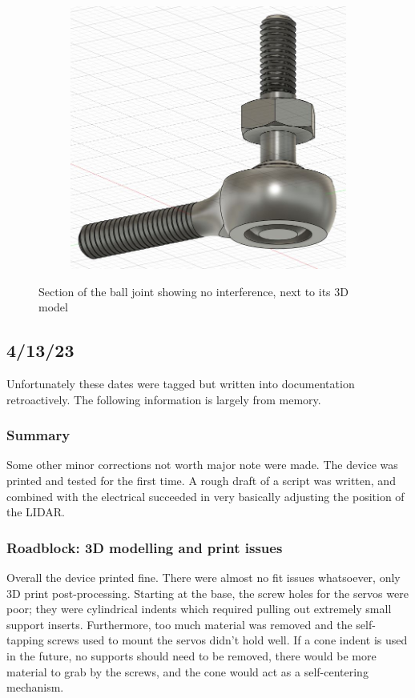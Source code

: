 \documentclass[a4paper, 10pt]{article}
\begin{document}
\begin{figure}[h]
\begin{subfigure}[h]{0.34\textwidth}
			\end{subfigure}
			\hfill
			\begin{subfigure}[h]{0.65\textwidth}
				\centering
				\includegraphics[width=\textwidth]{ball_joint}
			\end{subfigure}
			\centering
			\caption{Section of the ball joint showing no interference, next to its 3D model}
			\label{ball_joint}
		\end{figure}
		
	\subsection{4/13/23}
	Unfortunately these dates were tagged but written into documentation retroactively. The following information is largely from memory.
		\subsubsection{Summary}
		Some other minor corrections not worth major note were made. The device was printed and tested for the first time. A rough draft of a script was written, and combined with the electrical succeeded in very basically adjusting the position of the LIDAR. 
		
		\subsubsection{Roadblock: 3D modelling and print issues}
		Overall the device printed fine. There were almost no fit issues whatsoever, only 3D print post-processing. Starting at the base, the screw holes for the servos were poor; they were cylindrical indents which required pulling out extremely small support inserts. Furthermore, too much material was removed and the self-tapping screws used to mount the servos didn't hold well. If a cone indent is used in the future, no supports should need to be removed, there would be more material to grab by the screws, and the cone would act as a self-centering mechanism. 
		
\end{document}
